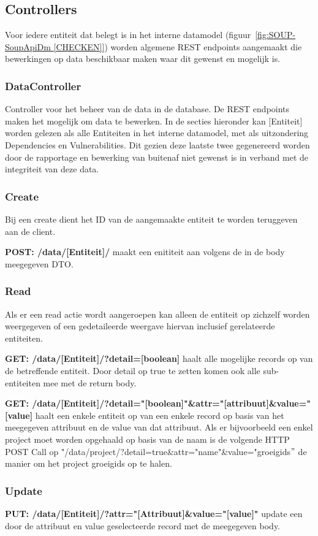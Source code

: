 \subsection{Controllers}\label{subsec:controllers}
Voor iedere entiteit dat belegt is in het interne datamodel (figuur~\ref{fig:SOUP-SoupApiDm [CHECKEN]}) worden algemene REST endpoints aangemaakt die bewerkingen op data beschikbaar maken waar dit gewenst en mogelijk is.
\subsubsection{DataController}
Controller voor het beheer van de data in de database. De REST endpoints maken het mogelijk om data te bewerken. In de secties hieronder kan [Entiteit] worden gelezen als alle Entiteiten in het interne datamodel, met als uitzondering Dependencies en Vulnerabilities. Dit gezien deze laatste twee gegenereerd worden door de rapportage en bewerking van buitenaf niet gewenst is in verband met de integriteit van deze data.
\subsubsection*{Create}
Bij een create dient het ID van de aangemaakte entiteit te worden teruggeven aan de client.

\textbf{POST: /data/[Entiteit]/} maakt een enititeit aan volgens de in de body meegegeven DTO.

\subsubsection*{Read}
Als er een read actie wordt aangeroepen kan alleen de entiteit op zichzelf worden weergegeven of een gedetaileerde weergave hiervan inclusief gerelateerde entiteiten.

\textbf{GET: /data/[Entiteit]/?detail=[boolean]} haalt alle mogelijke records op van de betreffende entiteit. Door detail op true te zetten komen ook alle sub-entiteiten mee met de return body.

\textbf{GET: /data/[Entiteit]/?detail="[boolean]"\&attr="[attribuut]\&value="[value]} haalt een enkele entiteit op van een enkele record op basis van het meegegeven attribuut en de value van dat attribuut. Als er bijvoorbeeld een enkel project moet worden opgehaald op basis van de naam is de volgende HTTP POST Call op "/data/project/?detail=true&attr="name"&value="groeigids$"$ de manier om het project groeigids op te halen.

\subsubsection*{Update}
\textbf{PUT: /data/[Entiteit]/?attr="[Attribuut]\&value="[value]"} update een door de attribuut en value geselecteerde record met de meegegeven body.
